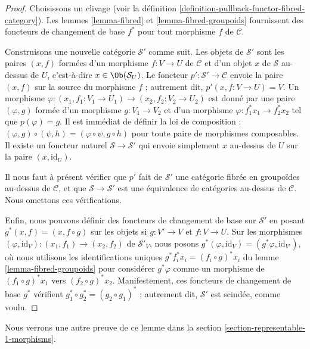 \begin{proof}
Choisissons un clivage (voir la
définition \ref{definition-pullback-functor-fibred-category}).
Les lemmes \ref{lemma-fibred} et \ref{lemma-fibred-groupoids}
fournissent des foncteurs de changement de base $f^*$ pour
tout morphisme $f$ de $\mathcal{C}$.

\medskip\noindent
Construisons une nouvelle catégorie $\mathcal{S}'$ comme suit.
Les objets de $\mathcal{S}'$ sont les paires $(x, f)$
formées d'un morphisme $f : V \to U$ de $\mathcal{C}$
et d'un objet $x$ de $\mathcal{S}$ au-dessus de $U$, c'est-à-dire
$x\in \Ob(\mathcal{S}_U)$. Le foncteur
$p' : \mathcal{S}' \to \mathcal{C}$ envoie la paire $(x, f)$ sur la source
du morphisme $f$ ; autrement dit, $p'(x, f : V\to U) = V$. Un morphisme
$\varphi : (x_1, f_1: V_1 \to U_1) \to (x_2, f_2 : V_2 \to U_2)$ est donné par une
paire $(\varphi, g)$ formée d'un morphisme $g : V_1 \to V_2$ et d'un morphisme
$\varphi : f_1^\ast x_1 \to f_2^\ast x_2$ tel que $p(\varphi) = g$. Il est
immédiat de définir la loi de composition : $(\varphi, g) \circ (\psi, h) =
(\varphi \circ \psi, g\circ h)$ pour toute paire de morphismes composables.
Il existe un foncteur naturel $\mathcal{S} \to \mathcal{S}'$ qui envoie simplement
$x$ au-dessus de $U$ sur la paire $(x, \text{id}_U)$.

\medskip\noindent
Il nous faut à présent vérifier que $p'$ fait de $\mathcal{S}'$ une catégorie
fibrée en groupoïdes au-dessus de $\mathcal{C}$, et que
$\mathcal{S} \to \mathcal{S}'$ est une équivalence de catégories au-dessus de
$\mathcal{C}$. Nous omettons ces vérifications.

\medskip\noindent
Enfin, nous pouvons définir des foncteurs de changement de base sur $\mathcal{S}'$
en posant $g^\ast(x, f) = (x, f \circ g)$ sur les objets si
$g : V' \to V$ et $f : V \to U$. Sur les morphismes
$(\varphi, \text{id}_V) : (x_1, f_1) \to (x_2, f_2)$
de $\mathcal{S}'_V$, nous posons $g^\ast(\varphi, \text{id}_V) =
(g^\ast\varphi, \text{id}_{V'})$, où nous utilisons les identifications uniques
$g^\ast f_i^\ast x_i = (f_i \circ g)^\ast x_i$ du lemme
\ref{lemma-fibred-groupoids} pour considérer $g^\ast\varphi$ comme un morphisme de
$(f_1 \circ g)^\ast x_1$ vers $(f_2 \circ g)^\ast x_2$. Manifestement, ces foncteurs
de changement de base $g^\ast$ vérifient
$g_1^\ast \circ g_2^\ast = (g_2\circ g_1)^\ast$ ; autrement dit, $\mathcal{S}'$
est scindée, comme voulu.
\end{proof}

\noindent
Nous verrons une autre preuve de ce lemme dans la
section \ref{section-representable-1-morphisms}.





